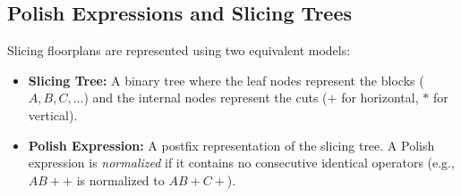 \documentclass[12pt,a4paper]{article}
\begin{document}
\subsection{Polish Expressions and Slicing Trees}
Slicing floorplans are represented using two equivalent models:
\begin{itemize}[leftmargin=*, itemsep=2pt]
  \item \textbf{Slicing Tree:} A binary tree where the leaf nodes represent the blocks ($A, B, C, \dots$) and the internal nodes represent the cuts ($+$ for horizontal, $*$ for vertical).
  \item \textbf{Polish Expression:} A postfix representation of the slicing tree. A Polish expression is \textit{normalized} if it contains no consecutive identical operators (e.g., $AB++$ is normalized to $AB+C+$).
\end{itemize}
\end{document}
